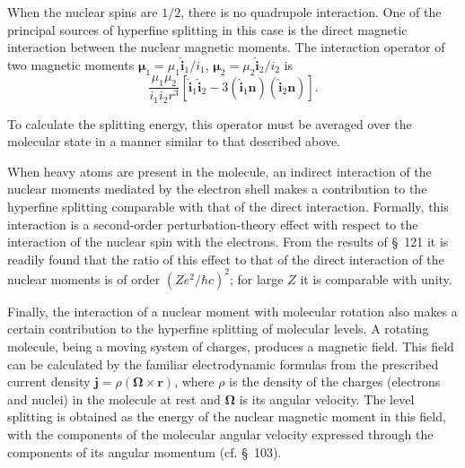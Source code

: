 When the nuclear spins are $1/2$, there is no quadrupole interaction. One of
the principal sources of hyperfine splitting in this case is the direct
magnetic interaction between the nuclear magnetic moments. The interaction
operator of two magnetic moments
$\boldsymbol\mu_1=\mu_1\hat{\mathbf i}_1/i_1$,
$\boldsymbol\mu_2=\mu_2\hat{\mathbf i}_2/i_2$ is
\[
 \frac{\mu_1\mu_2}{i_1i_2r^3}
 [\hat{\mathbf i}_1\hat{\mathbf i}_2
 -3(\hat{\mathbf i}_1\mathbf n)(\hat{\mathbf i}_2\mathbf n)].
\]

To calculate the splitting energy, this operator must be averaged over the
molecular state in a manner similar to that described above.

When heavy atoms are present in the molecule, an indirect interaction of the
nuclear moments mediated by the electron shell makes a contribution to the
hyperfine splitting comparable with that of the direct interaction. Formally,
this interaction is a second-order perturbation-theory effect with respect to
the interaction of the nuclear spin with the electrons. From the results of
\S~121 it is readily found that the ratio of this effect to that of the direct
interaction of the nuclear moments is of order $(Ze^2/\hbar c)^2$; for large
$Z$ it is comparable with unity.

Finally, the interaction of a nuclear moment with molecular rotation also
makes a certain contribution to the hyperfine splitting of molecular levels.
A rotating molecule, being a moving system of charges, produces a magnetic
field. This field can be calculated by the familiar electrodynamic formulas
from the prescribed current density
$\mathbf j=\rho(\boldsymbol\Omega\times\mathbf r)$, where $\rho$ is the
density of the charges (electrons and nuclei) in the molecule at rest and
$\boldsymbol\Omega$ is its angular velocity. The level splitting is obtained
as the energy of the nuclear magnetic moment in this field, with the
components of the molecular angular velocity expressed through the components
of its angular momentum (cf. \S~103).
